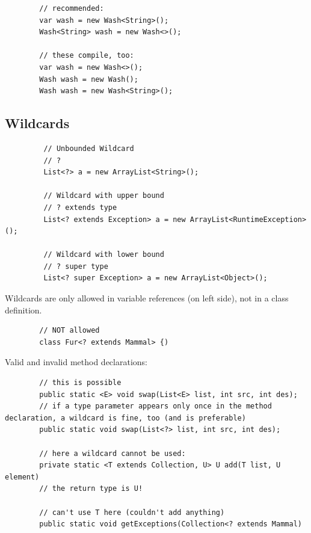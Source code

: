 \documentclass{scrartcl}
\begin{document}
    \begin{lstlisting}
        // recommended:
        var wash = new Wash<String>();
        Wash<String> wash = new Wash<>();

        // these compile, too:
        var wash = new Wash<>();
        Wash wash = new Wash();
        Wash wash = new Wash<String>();

    \end{lstlisting}



\subsection{Wildcards}

    \begin{lstlisting}
         // Unbounded Wildcard
         //	?
         List<?> a = new ArrayList<String>();

         // Wildcard with upper bound
         // ? extends type
         List<? extends Exception> a = new ArrayList<RuntimeException>();

         // Wildcard with lower bound
         //	? super type
         List<? super Exception> a = new ArrayList<Object>();
    \end{lstlisting}

     Wildcards are only allowed in variable references (on left side), not in a class definition.

    \begin{lstlisting}
        // NOT allowed
        class Fur<? extends Mammal> {)
    \end{lstlisting}

    Valid and invalid method declarations:

    \begin{lstlisting}
        // this is possible
        public static <E> void swap(List<E> list, int src, int des);
        // if a type parameter appears only once in the method declaration, a wildcard is fine, too (and is preferable)
        public static void swap(List<?> list, int src, int des);

        // here a wildcard cannot be used:
        private static <T extends Collection, U> U add(T list, U element)
        // the return type is U!

        // can't use T here (couldn't add anything)
        public static void getExceptions(Collection<? extends Mammal)
    \end{lstlisting}
\end{document}
